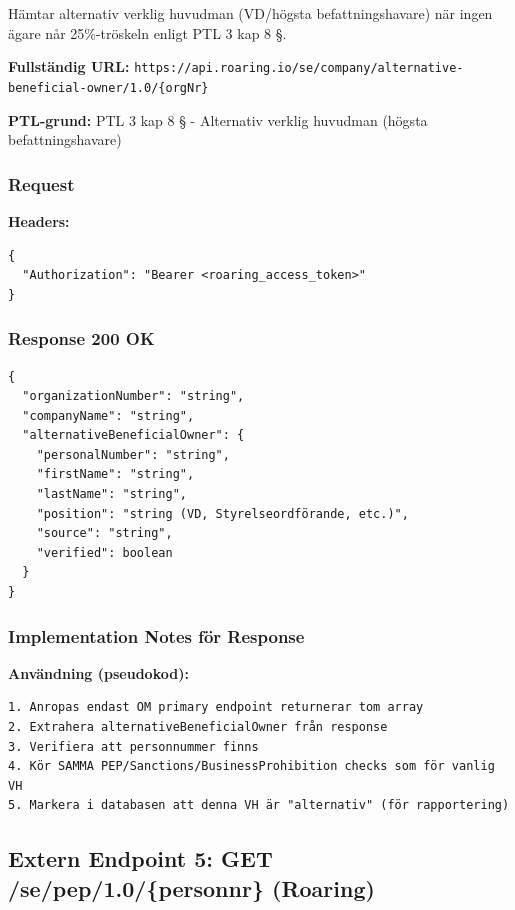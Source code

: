Hämtar alternativ verklig huvudman (VD/högsta befattningshavare) när ingen ägare når 25\%-tröskeln enligt PTL 3 kap 8 §.

\textbf{Fullständig URL:} \texttt{https://api.roaring.io/se/company/alternative-beneficial-owner/1.0/\{orgNr\}}

\textbf{PTL-grund:} PTL 3 kap 8 § - Alternativ verklig huvudman (högsta befattningshavare)

\subsubsection{Request}

\textbf{Headers:}
\begin{lstlisting}
{
  "Authorization": "Bearer <roaring_access_token>"
}
\end{lstlisting}

\subsubsection{Response 200 OK}
\begin{lstlisting}
{
  "organizationNumber": "string",
  "companyName": "string",
  "alternativeBeneficialOwner": {
    "personalNumber": "string",
    "firstName": "string",
    "lastName": "string",
    "position": "string (VD, Styrelseordförande, etc.)",
    "source": "string",
    "verified": boolean
  }
}
\end{lstlisting}

\subsubsection{Implementation Notes för Response}

\textbf{Användning (pseudokod):}
\begin{lstlisting}
1. Anropas endast OM primary endpoint returnerar tom array
2. Extrahera alternativeBeneficialOwner från response
3. Verifiera att personnummer finns
4. Kör SAMMA PEP/Sanctions/BusinessProhibition checks som för vanlig VH
5. Markera i databasen att denna VH är "alternativ" (för rapportering)
\end{lstlisting}

\subsection{Extern Endpoint 5: GET /se/pep/1.0/\{personnr\} (Roaring)}

